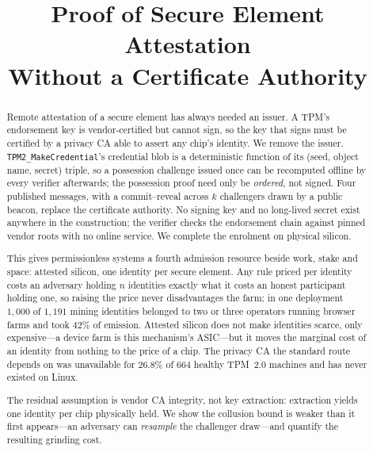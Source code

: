 \documentclass[conference,10pt]{IEEEtran}
\begin{document}
\title{Proof of Secure Element Attestation\\
Without a Certificate Authority}

\author{
}

\maketitle

\begin{abstract}
Remote attestation of a secure element has always needed an issuer. A TPM's endorsement key is
vendor-certified but cannot sign, so the key that signs must be certified by a privacy CA able to assert
any chip's identity. We remove the issuer. \texttt{TPM2\_MakeCredential}'s credential blob is a
deterministic function of its (seed, object name, secret) triple, so a possession challenge issued once
can be recomputed offline by every verifier afterwards; the possession proof need only be
\emph{ordered}, not signed. Four published messages, with a commit--reveal across $k$ challengers drawn
by a public beacon, replace the certificate authority. No signing key and no long-lived secret exist
anywhere in the construction; the verifier checks the endorsement chain against pinned vendor roots
with no online service. We complete the enrolment on physical silicon.

This gives permissionless systems a fourth admission resource beside work, stake and space: attested
silicon, one identity per secure element. Any rule priced per identity costs an adversary holding $n$
identities exactly what it costs an honest participant holding one, so raising the price
never disadvantages the farm; in one deployment $1{,}000$ of $1{,}191$ mining identities
belonged to two or three operators running browser farms and took $42\%$ of emission. Attested silicon
does not make identities scarce, only expensive---a device farm is this mechanism's ASIC---but it moves
the marginal cost of an identity from nothing to the price of a chip. The privacy CA the standard route depends on was unavailable for
$26.8\%$ of $664$ healthy TPM~2.0 machines and has never existed on Linux.

The residual assumption is vendor CA integrity, not key extraction: extraction yields one identity per
chip physically held. We show the collusion bound is weaker than it first appears---an adversary can
\emph{resample} the challenger draw---and quantify the resulting grinding cost.
\end{abstract}
\end{document}
